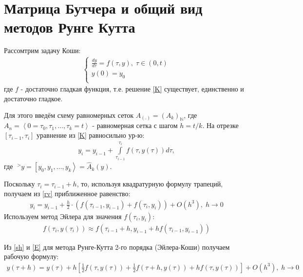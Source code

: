 \documentclass[__main__.tex]{subfiles}
\begin{document}
\section{Матрица Бутчера и общий вид методов Рунге Кутта}

Рассомтрим задачу Коши:
\begin{gather}
	\begin{cases}
		\frac{dy}{d\tau}=f(\tau,y),\; \tau\in(0,t)\\
		y(0)=y_0\\
	\end{cases}
	\label{K}
\end{gather}
где $f$ - достаточно гладкая функция, т.е. решение \ref{K} существует, единственно и достаточно гладкое.

Для этого введём схему равномерных сеток $A_{(.)} = (A_{k})_{\mathbb{N}}$, где $A_n=\left< 0=\tau_0,\tau_1,\dots,\tau_k=t \right>$ - равномерная сетка с шагом $h=t/k$. На отрезке $[\tau_{i-1},\tau_i]$ уравнение из \ref{K} равносильно ур-ю:
\begin{gather}
	y_i=y_{i-1}+\int\limits_{\tau_{i-1}}^{\tau_i}f(\tau,y(\tau))d\tau,
	\label{rv}
\end{gather}
где $\;^>y=\left[y_0,y_1,\dots,y_k\right> = \hat A_k(y)$.

Поскольку $\tau_i=\tau_{i-1}+h$, то, используя квадратурную формулу трапеций, получаем из \ref{rv} приближенное равенство:
\begin{gather}
	y_i=y_{i-1}+\frac{h}{2}\cdot\left(f(\tau_{i-1},y_{i-1})+f(\tau_{i},y_{i})\right)+O(h^3),\; h\rightarrow0
	\label{sh}
\end{gather}
Используем метод Эйлера для значения $f(\tau_i,y_i)$:
\begin{gather}
	f(\tau_i,y(\tau_i))\approx f(\tau_{i-1}+h,y_{i-1}+hf(\tau_{i-1},y_{i-1}))
	\label{E}
\end{gather}

Из \ref{sh} и \ref{E} для метода Рунге-Кутта 2-го порядка (Эйлера-Коши) получаем рабочую формулу:
\begin{gather}
	y(\tau+h)=y(\tau)+h\left[\frac{1}{2}f(\tau,y(\tau))+\frac{1}{2}f(\tau+h,y(\tau))+hf(\tau,y(\tau))\right]+O(h^3),\; h\rightarrow0
	\label{rk}
\end{gather}
\end{document}
